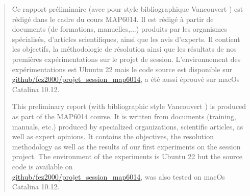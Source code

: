 {}
\begin{abstract}
\setcounter{page}{3}
\protect\thispagestyle{fancy}
\doublespacing
Ce rapport préliminaire (avec pour style bibliographique Vancouvert \cite{styleBliblio}) est rédigé dans le cadre du cours MAP6014. Il est rédigé à partir de documents (de formations, manuelles,...) produits par les organismes spécialisés, d'articles scientifiques, ainsi que les avis d'experts. Il contient les objectifs, la méthodologie de résolution ainsi que les résultats de nos premières expérimentations sur le projet de session. L’environnement
des expérimentations est Ubuntu 22 mais le code source est disponible
sur \\\href{https://github.com/fez2000/projet_session_map6014}{github/fez2000/projet\_session\_map6014}, a été aussi éprouvé sur macOs Catalina 10.12.
\newline


\noindent This preliminary report (with bibliographic style Vancouvert \cite{styleBliblio}) is produced as part of the MAP6014 course. It is written from documents (training, manuals, etc.) produced by specialized organizations, scientific articles, as well as expert opinions. It contains the objectives, the resolution methodology as well as the results
of our first experiments on the session project. The environment
of the experiments is Ubuntu 22 but the source code is available
on \\\href{https://github.com/fez2000/projet_session_map6014}{github/fez2000/projet\_session\_map6014}, was also tested on macOs Catalina 10.12.

\end{abstract}